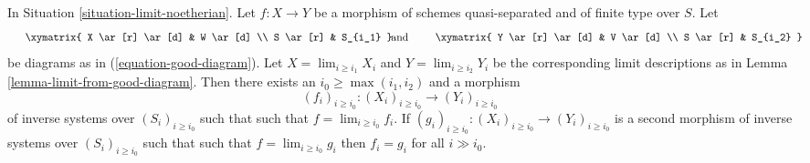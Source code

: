 \begin{lemma}
\label{lemma-morphism-good-diagram}
In Situation \ref{situation-limit-noetherian}.
Let $f : X \to Y$ be a morphism of schemes quasi-separated
and of finite type over $S$. Let
$$
\vcenter{
\xymatrix{
X \ar[r] \ar[d] & W \ar[d] \\
S \ar[r] & S_{i_1}
}
}
\quad\text{and}\quad
\vcenter{
\xymatrix{
Y \ar[r] \ar[d] & V \ar[d] \\
S \ar[r] & S_{i_2}
}
}
$$
be diagrams as in (\ref{equation-good-diagram}). Let
$X = \lim_{i \geq i_1} X_i$ and
$Y = \lim_{i \geq i_2} Y_i$ be the corresponding
limit descriptions as in Lemma \ref{lemma-limit-from-good-diagram}.
Then there exists an $i_0 \geq \max(i_1, i_2)$ and a morphism
$$
(f_i)_{i \geq i_0} : (X_i)_{i \geq i_0} \to (Y_i)_{i \geq i_0}
$$
of inverse systems over $(S_i)_{i \geq i_0}$ such that
such that $f = \lim_{i \geq i_0} f_i$.
If $(g_i)_{i \geq i_0} : (X_i)_{i \geq i_0} \to (Y_i)_{i \geq i_0}$
is a second morphism of inverse systems over $(S_i)_{i \geq i_0}$ such that
such that $f = \lim_{i \geq i_0} g_i$
then $f_i = g_i$ for all $i \gg i_0$.
\end{lemma}

